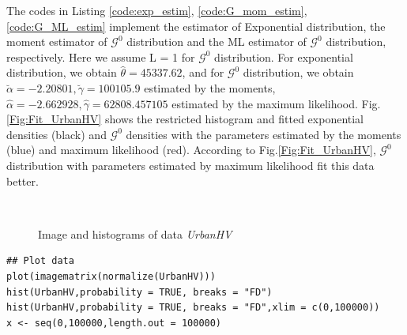 \documentclass[conference,onecolumn]{IEEEtran}
\begin{document}
The codes in Listing \ref{code:exp_estim}, \ref{code:G_mom_estim}, \ref{code:G_ML_estim} implement the estimator of Exponential distribution, the moment estimator of $\mathcal{G}^0$ distribution and the ML estimator of $\mathcal{G}^0$ distribution, respectively. Here we assume L = 1 for $\mathcal{G}^0$ distribution. For exponential distribution, we obtain $\hat{\theta}=45337.62$, and for $\mathcal{G}^0$ distribution, we obtain $\breve{\alpha}=-2.20801, \breve{\gamma}=100105.9$ estimated by the moments, $\hat{\alpha}=-2.662928, \hat{\gamma}=62808.457105$ estimated by the maximum likelihood. Fig.\ref{Fig:Fit_UrbanHV} shows the restricted histogram and fitted exponential densities (black) and $\mathcal{G}^0$ densities with the parameters estimated by the moments (blue) and maximum likelihood (red). According to Fig.\ref{Fig:Fit_UrbanHV}, $\mathcal{G}^0$ distribution with parameters estimated by maximum likelihood fit this data better.


\begin{figure}[htbp]
	\centering
	\ 
	\ 
	\ 
	\caption{Image and histograms of data \textit{UrbanHV}}
	\label{Fig:Urban}
\end{figure}

\begin{lstlisting}[caption={Plot the data},label={code:plot_hist}]
## Plot data
plot(imagematrix(normalize(UrbanHV)))
hist(UrbanHV,probability = TRUE, breaks = "FD")
hist(UrbanHV,probability = TRUE, breaks = "FD",xlim = c(0,100000))
x <- seq(0,100000,length.out = 100000)
\end{lstlisting}
\end{document}
